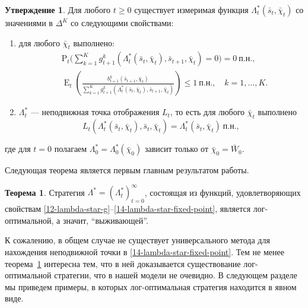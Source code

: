 \documentclass[a4paper,12pt,russian]{article} %
\theoremstyle{definition}
\newtheorem{theorem}{Теорема}
\newtheorem{proposition}{Утверждение}
\DeclareMathOperator{\E}{E}
\renewcommand{\P}{\mathrm{P}}
\begin{document}
\begin{proposition}
\label{lemma2-lambda-star}
Для любого $t\ge0$ существует измеримая функция $\Lambda_t^*(\bar s_t,\bar\chi_t)$ со значениями в  $\Delta^K$ со следующими свойствами:
\begin{enumerate}[leftmargin=*, label=(\alph*), widest=a]
\item для любого $\bar\chi_t$ выполнено:
\begin{align}
\label{12-lambda-star-g}
&\P_t\Biggl(
    \sum_{k=1}^K g_{t+1}^k(\Lambda_t^*(\bar s_t,\bar\chi_t),\bar s_{t+1},\bar\chi_t) = 0
  \Biggr) = 0\ \text{п.н.},\\
\label{13-lambda-star-inequality}
&\E_t\left( 
  \frac{b_{t+1}^k(\bar s_{t+1},\bar\chi_t)}
       {\sum_{k=1}^K g_{t+1}^k(\Lambda^*_t(\bar s_{t},\bar\chi_t), \bar s_{t+1},\bar\chi_t)}
  \right) \le 1\ \text{п.н.}, \quad k=1,\dots,K.
\end{align}

\item $\Lambda_t^*$ — неподвижная точка отображения $L_t$, то есть для любого $\bar\chi_t$ выполнено
\begin{equation}
\label{14-lambda-star-fixed-point}
L_{t}(\Lambda_{t}^*(\bar s_t,\bar\chi_t), \bar s_t, \bar\chi_t) 
= \Lambda^*_{t}(\bar s_t,\bar\chi_t)\ \text{п.н.}, 
\end{equation}
\end{enumerate}
где для $t=0$ полагаем $\Lambda_0^*=\Lambda^*_0(\bar\chi_0)$ зависит только от $\bar\chi_0=\bar W_0$.
\end{proposition}



Следующая теорема является первым главным результатом работы.


\begin{theorem}
\label{theorem1-main}
Стратегия $\Lambda^* = (\Lambda_t^*)_{t=0}^\infty$, состоящая из функций, удовлетворяющих свойствам \eqref{12-lambda-star-g}--\eqref{14-lambda-star-fixed-point}, является лог-оптимальной, а значит, ``выживающей''.
\end{theorem}

К сожалению, в общем случае не существует универсального метода для нахождения неподвижной точки в \eqref{14-lambda-star-fixed-point}. Тем не менее теорема~\ref{theorem1-main} интересна тем, что в ней доказывается существование лог-оптимальной стратегии, что в нашей модели не очевидно. В следующем разделе мы приведем примеры, в которых лог-оптимальная стратегия находится в явном виде.
\end{document}
